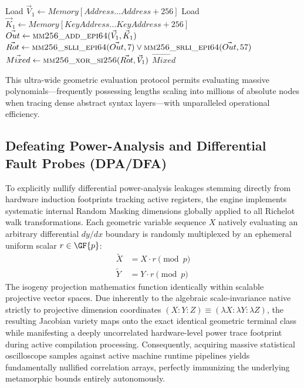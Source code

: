 \begin{algorithm}[H]
\caption{SIMD Batch Evaluation for ARX Propagation Network}
\begin{algorithmic}[1]
\State Load $\Vec{V}_1 \gets Memory[Address \dots Address+256]$
\State Load $\Vec{K}_1 \gets Memory[KeyAddress \dots KeyAddress+256]$
\State $\Vec{Out} \gets \textsc{mm256\_add\_epi64}(\Vec{V}_1, \Vec{K}_1)$ 
\State $\Vec{Rot} \gets \textsc{mm256\_slli\_epi64}(\Vec{Out}, 7) \lor \textsc{mm256\_srli\_epi64}(\Vec{Out}, 57)$
\State $\Vec{Mixed} \gets \textsc{mm256\_xor\_si256}(\Vec{Rot}, \Vec{V}_1)$ 
\State \Return $\Vec{Mixed}$
\end{algorithmic}
\label{alg:simd_arx}
\end{algorithm}
This ultra-wide geometric evaluation protocol permits evaluating massive polynomials—frequently possessing lengths scaling into millions of absolute nodes when tracing dense abstract syntax layers—with unparalleled operational efficiency.

\subsection{Defeating Power-Analysis and Differential Fault Probes (DPA/DFA)}
To explicitly nullify differential power-analysis leakages stemming directly from hardware induction footprints tracking active registers, the engine implements systematic internal Random Masking dimensions globally applied to all Richelot walk transformations. Each geometric variable sequence $X$ natively evaluating an arbitrary differential $dy/dx$ boundary is randomly multiplexed by an ephemeral uniform scalar $r \in \GF{p}$:
\begin{align}
    \tilde{X} &= X \cdot r \pmod p \\
    \tilde{Y} &= Y \cdot r \pmod p
\end{align}
The isogeny projection mathematics function identically within scalable projective vector spaces. Due inherently to the algebraic scale-invariance native strictly to projective dimension coordinates $(X:Y:Z) \equiv (\lambda X : \lambda Y : \lambda Z)$, the resulting Jacobian variety maps onto the exact identical geometric terminal class while manifesting a deeply uncorrelated hardware-level power trace footprint during active compilation processing. Consequently, acquiring massive statistical oscilloscope samples against active machine runtime pipelines yields fundamentally nullified correlation arrays, perfectly immunizing the underlying metamorphic bounds entirely autonomously. 

